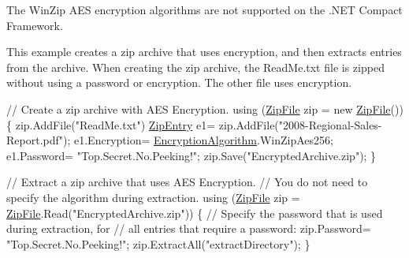 The Win\+Zip A\+ES encryption algorithms are not supported on the .N\+ET Compact Framework. 

This example creates a zip archive that uses encryption, and then extracts entries from the archive. When creating the zip archive, the Read\+Me.\+txt file is zipped without using a password or encryption. The other file uses encryption. 


\begin{DoxyCode}
\textcolor{comment}{// Create a zip archive with AES Encryption.}
\textcolor{keyword}{using} (\mbox{\hyperlink{namespace_super_tiled2_unity_1_1_ionic_1_1_zip_a9ced5352c56e7e0fceff15b534073c83a088ad16b06174c69965e232063ba6d16}{ZipFile}} zip = \textcolor{keyword}{new} \mbox{\hyperlink{namespace_super_tiled2_unity_1_1_ionic_1_1_zip_a9ced5352c56e7e0fceff15b534073c83a088ad16b06174c69965e232063ba6d16}{ZipFile}}())
\{
    zip.AddFile(\textcolor{stringliteral}{"ReadMe.txt"})
    \mbox{\hyperlink{class_super_tiled2_unity_1_1_ionic_1_1_zip_1_1_zip_entry_a440b6d4d136b20dc6bdbdd399397e3a0}{ZipEntry}} e1= zip.AddFile(\textcolor{stringliteral}{"2008-Regional-Sales-Report.pdf"});
    e1.Encryption= \mbox{\hyperlink{namespace_super_tiled2_unity_1_1_ionic_1_1_zip_aa3f4e8aa12ef827ac72177a49b4e28e6}{EncryptionAlgorithm}}.WinZipAes256;
    e1.Password= \textcolor{stringliteral}{"Top.Secret.No.Peeking!"};
    zip.Save(\textcolor{stringliteral}{"EncryptedArchive.zip"});
\}

\textcolor{comment}{// Extract a zip archive that uses AES Encryption.}
\textcolor{comment}{// You do not need to specify the algorithm during extraction.}
\textcolor{keyword}{using} (\mbox{\hyperlink{namespace_super_tiled2_unity_1_1_ionic_1_1_zip_a9ced5352c56e7e0fceff15b534073c83a088ad16b06174c69965e232063ba6d16}{ZipFile}} zip = \mbox{\hyperlink{namespace_super_tiled2_unity_1_1_ionic_1_1_zip_a9ced5352c56e7e0fceff15b534073c83a088ad16b06174c69965e232063ba6d16}{ZipFile}}.Read(\textcolor{stringliteral}{"EncryptedArchive.zip"}))
\{
    \textcolor{comment}{// Specify the password that is used during extraction, for}
    \textcolor{comment}{// all entries that require a password:}
    zip.Password= \textcolor{stringliteral}{"Top.Secret.No.Peeking!"};
    zip.ExtractAll(\textcolor{stringliteral}{"extractDirectory"});
\}
\end{DoxyCode}



